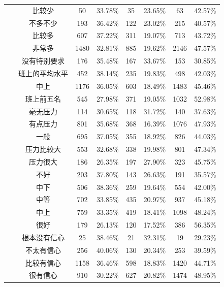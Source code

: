 \documentclass[zihao = -4, linespread = 1.5]{article}
\begin{document}
\begin{table}[!t]
{\begin{tabular}{cccccccc}
            ~ & 比较少 & 50 & 33.78\% & 35 & 23.65\% & 63 & 42.57\% \\
            ~ & 不多不少 & 193 & 36.42\% & 122 & 23.02\% & 215 & 40.57\% \\
            ~ & 比较多 & 607 & 37.22\% & 311 & 19.07\% & 713 & 43.72\% \\
            ~ & 非常多 & 1480 & 32.81\% & 885 & 19.62\% & 2146 & 47.57\% \\
            \addlinespace
            \multirow{4}{*}{家长学业成绩要求} & 没有特别要求 & 176 & 35.48\% & 167 & 33.67\% & 153 & 30.85\% \\
            ~ & 班上的平均水平 & 452 & 38.14\% & 235 & 19.83\% & 498 & 42.03\% \\
            ~ & 中上 & 1176 & 36.05\% & 603 & 18.49\% & 1483 & 45.46\% \\
            ~ & 班上前五名 & 545 & 27.98\% & 371 & 19.05\% & 1032 & 52.98\% \\
            \addlinespace
            \multirow{5}{*}{对期望感到} & 毫无压力 & 114 & 30.65\% & 118 & 31.72\% & 140 & 37.63\% \\
            ~ & 有点压力 & 801 & 35.68\% & 368 & 16.39\% & 1076 & 47.93\% \\
            ~ & 一般 & 695 & 37.05\% & 355 & 18.92\% & 826 & 44.03\% \\
            ~ & 压力比较大 & 553 & 32.68\% & 338 & 19.98\% & 801 & 47.34\% \\
            ~ & 压力很大 & 186 & 26.35\% & 197 & 27.90\% & 323 & 45.75\% \\
            \addlinespace
            \multirow{5}{*}{成绩} & 不好 & 203 & 37.80\% & 143 & 26.63\% & 191 & 35.57\% \\
            ~ & 中下 & 506 & 38.36\% & 259 & 19.64\% & 554 & 42.00\% \\
            ~ & 中等 & 702 & 33.85\% & 435 & 20.97\% & 937 & 45.18\% \\
            ~ & 中上 & 759 & 33.35\% & 419 & 18.41\% & 1098 & 48.24\% \\
            ~ & 很好 & 179 & 26.13\% & 120 & 17.52\% & 386 & 56.35\% \\
            \addlinespace
            \multirow{5}{*}{对未来} & 根本没有信心 & 25 & 38.46\% & 21 & 32.31\% & 19 & 29.23\% \\
            ~ & 不太有信心 & 256 & 40.06\% & 130 & 20.34\% & 253 & 39.59\% \\
            ~ & 比较有信心 & 1158 & 36.46\% & 598 & 18.83\% & 1420 & 44.71\% \\
            ~ & 很有信心 & 910 & 30.22\% & 627 & 20.82\% & 1474 & 48.95\% \\
            \toprule[1.5pt]
        \end{tabular}
    }
\end{table}
\end{document}
